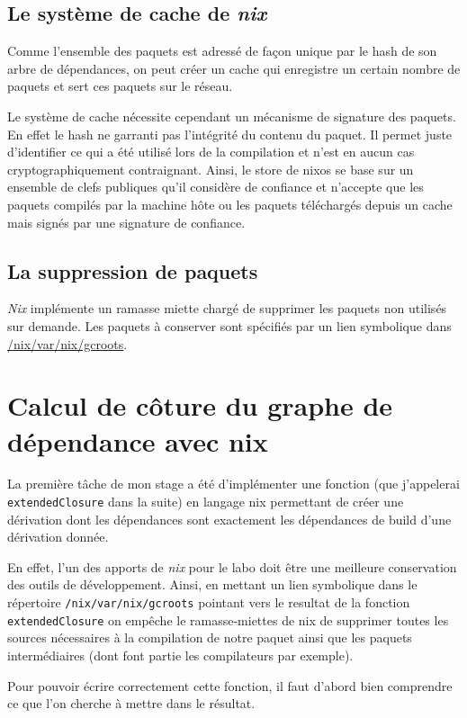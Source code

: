 \documentclass[a4paper,12pt]{article}
\begin{document}
\subsection{Le système de cache de \emph{nix}}

Comme l'ensemble des paquets est adressé  de façon unique par le hash de son
arbre de dépendances, on peut créer un cache qui enregistre un certain nombre
de paquets et sert ces paquets sur le réseau.

Le système de cache nécessite cependant un mécanisme de signature des paquets.
En effet le hash ne garranti pas l'intégrité du contenu du paquet. Il permet
juste d'identifier ce qui a été utilisé lors de la compilation et n'est en aucun
cas cryptographiquement contraignant. Ainsi, le store de nixos se base sur un
ensemble de clefs publiques qu'il considère de confiance et n'accepte que les
paquets compilés par la machine hôte ou les paquets téléchargés depuis un cache
mais signés par une signature de confiance.

\subsection{La suppression de paquets}

\emph{Nix} implémente un ramasse miette chargé de supprimer les paquets non utilisés
sur demande. Les paquets à conserver sont spécifiés par un lien symbolique dans
\url{/nix/var/nix/gcroots}.

\section{Calcul de côture du graphe de dépendance avec nix}

La première tâche de mon stage a été d'implémenter une fonction (que j'appelerai
\texttt{extendedClosure} dans la suite) en langage nix permettant de créer une
dérivation dont les dépendances sont exactement les dépendances de build d'une
dérivation donnée.

En effet, l'un des apports de \emph{nix} pour le labo doit être une meilleure
conservation des outils de développement. Ainsi, en mettant un lien symbolique
dans le répertoire \texttt{/nix/var/nix/gcroots} pointant vers le resultat de la
fonction \texttt{extendedClosure} on empêche le ramasse-miettes de nix de supprimer
toutes les sources nécessaires à la compilation de notre paquet ainsi que les
paquets intermédiaires (dont font partie les compilateurs par exemple).


Pour pouvoir écrire correctement cette fonction, il faut d'abord bien comprendre
ce que l'on cherche à mettre dans le résultat.
\end{document}
